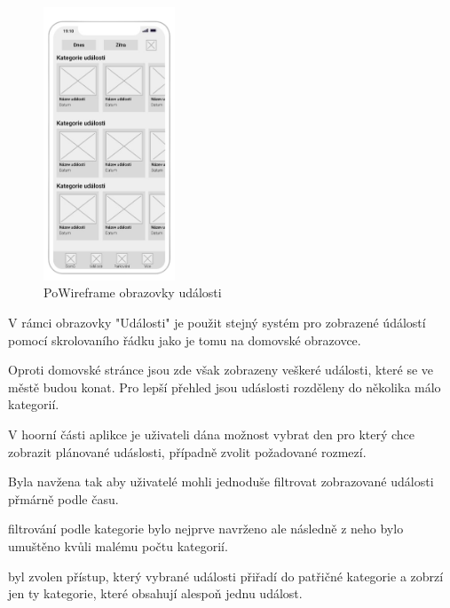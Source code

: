 


\begin{figure}
  \centering
  \includegraphics[width=0.35\textwidth]{events_wireframe.png}
  \caption{PoWireframe obrazovky události}
\end{figure}

V rámci obrazovky "Události" je použit stejný systém pro zobrazené údálostí pomocí skrolovaního řádku jako je tomu na domovské obrazovce.

Oproti domovské stránce jsou zde však zobrazeny veškeré události, které se ve městě budou konat. Pro lepší přehled jsou udáslosti rozděleny 
do několika málo kategorií.

V hoorní části aplikce je uživateli dána možnost vybrat den pro který chce zobrazit plánované udáslosti, případně zvolit požadované rozmezí.



Byla navžena tak aby uživatelé mohli jednoduše filtrovat zobrazované události přmárně podle času.

filtrování podle kategorie bylo nejprve navrženo ale následně z neho bylo umuštěno kvůli malému počtu kategorií.

byl zvolen přístup, který vybrané události přiřadí do patřičné kategorie a zobrzí jen ty kategorie, které obsahují alespoň jednu událost.

